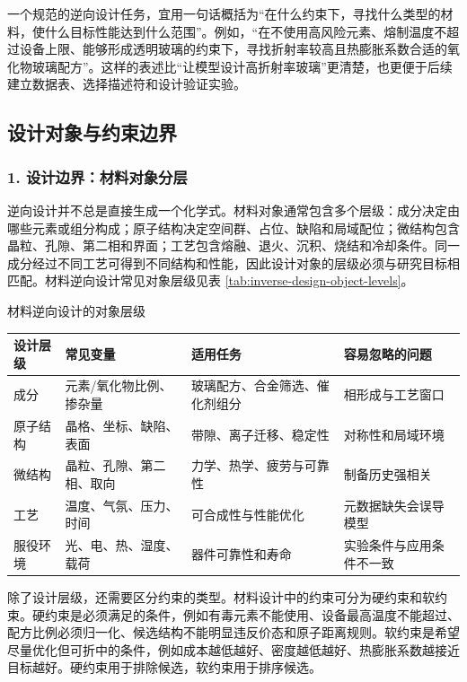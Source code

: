 一个规范的逆向设计任务，宜用一句话概括为“在什么约束下，寻找什么类型的材料，使什么目标性能达到什么范围”。例如，“在不使用高风险元素、熔制温度不超过设备上限、能够形成透明玻璃的约束下，寻找折射率较高且热膨胀系数合适的氧化物玻璃配方”。这样的表述比“让模型设计高折射率玻璃”更清楚，也更便于后续建立数据表、选择描述符和设计验证实验。

\subsection{设计对象与约束边界}

\subsubsection*{\textbf{1. 设计边界：材料对象分层}}

逆向设计并不总是直接生成一个化学式。材料对象通常包含多个层级：成分决定由哪些元素或组分构成；原子结构决定空间群、占位、缺陷和局域配位；微结构包含晶粒、孔隙、第二相和界面；工艺包含熔融、退火、沉积、烧结和冷却条件。同一成分经过不同工艺可得到不同结构和性能，因此设计对象的层级必须与研究目标相匹配。材料逆向设计常见对象层级见表 \ref{tab:inverse-design-object-levels}。


\begin{formalTable}[htbp]
\caption{材料逆向设计的对象层级}
\label{tab:inverse-design-object-levels}
\begin{tabularx}{\textwidth}{@{}YYYY@{}}
\toprule
\textbf{设计层级} & \textbf{常见变量} & \textbf{适用任务} & \textbf{容易忽略的问题} \\
\midrule
成分 & 元素/氧化物比例、掺杂量 & 玻璃配方、合金筛选、催化剂组分 & 相形成与工艺窗口 \\
原子结构 & 晶格、坐标、缺陷、表面 & 带隙、离子迁移、稳定性 & 对称性和局域环境 \\
微结构 & 晶粒、孔隙、第二相、取向 & 力学、热学、疲劳与可靠性 & 制备历史强相关 \\
工艺 & 温度、气氛、压力、时间 & 可合成性与性能优化 & 元数据缺失会误导模型 \\
服役环境 & 光、电、热、湿度、载荷 & 器件可靠性和寿命 & 实验条件与应用条件不一致 \\
\bottomrule
\end{tabularx}
\end{formalTable}

除了设计层级，还需要区分约束的类型。材料设计中的约束可分为硬约束和软约束。硬约束是必须满足的条件，例如有毒元素不能使用、设备最高温度不能超过、配方比例必须归一化、候选结构不能明显违反价态和原子距离规则。软约束是希望尽量优化但可折中的条件，例如成本越低越好、密度越低越好、热膨胀系数越接近目标越好。硬约束用于排除候选，软约束用于排序候选。

